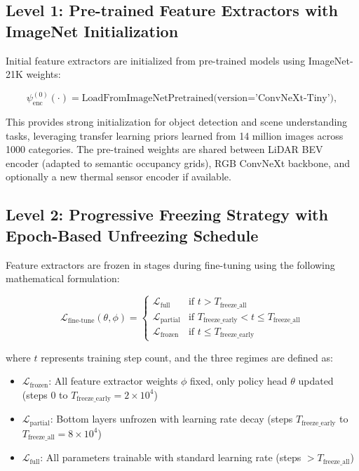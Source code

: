 \documentclass[10pt,twocolumn,letterpaper]{article}
\begin{document}
\subsection{Level 1: Pre-trained Feature Extractors with ImageNet Initialization}

Initial feature extractors are initialized from pre-trained models using ImageNet-21K weights:

\begin{equation}
    \psi^{(0)}_\text{enc}(\cdot) = \text{LoadFromImageNetPretrained(version='ConvNeXt-Tiny')},
    \label{eq:init_pretrained}
\end{equation}

This provides strong initialization for object detection and scene understanding tasks, leveraging transfer learning priors learned from 14 million images across 1000 categories. The pre-trained weights are shared between LiDAR BEV encoder (adapted to semantic occupancy grids), RGB ConvNeXt backbone, and optionally a new thermal sensor encoder if available.

\subsection{Level 2: Progressive Freezing Strategy with Epoch-Based Unfreezing Schedule}

Feature extractors are frozen in stages during fine-tuning using the following mathematical formulation:

\begin{equation}
    \mathcal{L}_\text{fine-tune}(\theta,\phi) = 
    \begin{cases}
        \mathcal{L}_\text{full} & \text{if } t > T_\text{freeze\_all} \\
        \mathcal{L}_\text{partial} & \text{if } T_\text{freeze\_early} < t \le T_\text{freeze\_all} \\
        \mathcal{L}_\text{frozen} & \text{if } t \le T_\text{freeze\_early}
    \end{cases}
    \label{eq:freezing_schedule}
\end{equation}

where $t$ represents training step count, and the three regimes are defined as:
\begin{itemize}
    \item $\mathcal{L}_\text{frozen}$: All feature extractor weights $\phi$ fixed, only policy head $\theta$ updated (steps 0 to $T_\text{freeze\_early} = 2\times10^4$)
    \item $\mathcal{L}_\text{partial}$: Bottom layers unfrozen with learning rate decay (steps $T_\text{freeze\_early}$ to $T_\text{freeze\_all} = 8\times10^4$)
    \item $\mathcal{L}_\text{full}$: All parameters trainable with standard learning rate (steps $> T_\text{freeze\_all}$)
\end{itemize}
\end{document}
